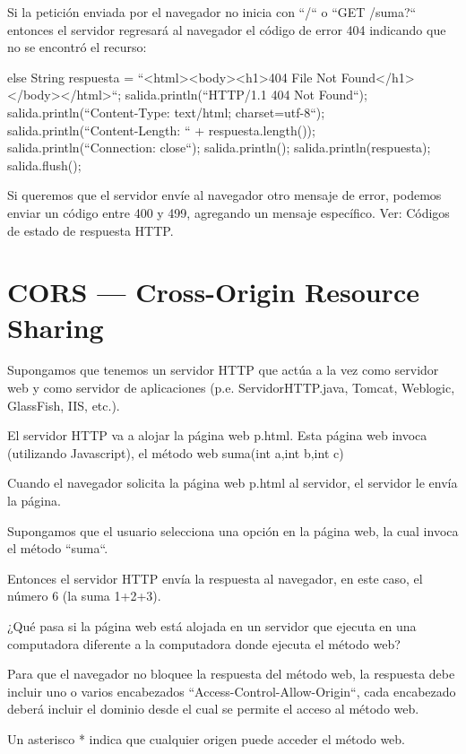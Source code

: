 \documentclass[11pt,a4paper,oneside]{book}
\begin{document}
Si la petición enviada por el navegador no inicia con ``/`` o ``GET /suma?`` entonces el servidor regresará al navegador el código de error 404 indicando que no se encontró el recurso:

\begin{SourceCode}
else
{
  String respuesta = ``<html><body><h1>404 File Not Found</h1></body></html>``;
  salida.println(``HTTP/1.1 404 Not Found``);
  salida.println(``Content-Type: text/html; charset=utf-8``);
  salida.println(``Content-Length: `` + respuesta.length());
  salida.println(``Connection: close``);
  salida.println();
  salida.println(respuesta);
  salida.flush();
}
\end{SourceCode}

Si queremos que el servidor envíe al navegador otro mensaje de error, podemos enviar un código entre 400 y 499, agregando un mensaje específico. Ver: Códigos de estado de respuesta HTTP.

\section{CORS — Cross-Origin Resource Sharing}

Supongamos que tenemos un servidor HTTP que actúa a la vez como servidor web y como servidor de aplicaciones (p.e. ServidorHTTP.java, Tomcat, Weblogic, GlassFish, IIS, etc.).

El servidor HTTP va a alojar la página web p.html. Esta página web invoca (utilizando Javascript), el método web suma(int a,int b,int c)

Cuando el navegador solicita la página web p.html al servidor, el servidor le envía la página.

Supongamos que el usuario selecciona una opción en la página web, la cual invoca el método ``suma``.

Entonces el servidor HTTP envía la respuesta al navegador, en este caso, el número 6 (la suma 1+2+3).

¿Qué pasa si la página web está alojada en un servidor que ejecuta en una computadora diferente a la computadora donde ejecuta el método web?

Para que el navegador no bloquee la respuesta del método web, la respuesta debe incluir uno o varios encabezados ``Access-Control-Allow-Origin``, cada encabezado deberá incluir el dominio desde el cual se permite el acceso al método web.

Un asterisco * indica que cualquier origen puede acceder el método web.
\end{document}
